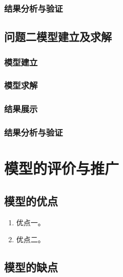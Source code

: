 \documentclass[12pt,a4paper]{ctexart}
\theoremstyle{definition}
\theoremstyle{plain}
\theoremstyle{remark}
\begin{document}
\subsubsection{结果分析与验证}



\subsection{问题二模型建立及求解}

\subsubsection{模型建立}
\subsubsection{模型求解}
\subsubsection{结果展示}
\subsubsection{结果分析与验证}




\section{模型的评价与推广}

\subsection{模型的优点}

\begin{enumerate}[label=\arabic*.]
  \item 优点一。
  \item 优点二。
\end{enumerate}

\subsection{模型的缺点}
\end{document}
